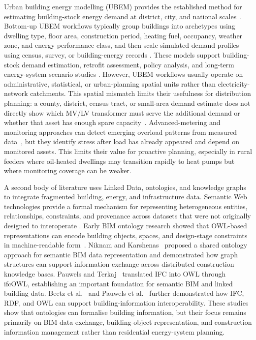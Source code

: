 \documentclass[preprint,12pt]{elsarticle}
\begin{document}
Urban building energy modelling (UBEM) provides the established method for
estimating building-stock energy demand at district, city, and national
scales~\cite{reinhart_urban_2016,cerezo_davila_comparison_2016,
hong_ten_2020,kamel_systematic_2022,oraiopoulos_accuracy_2022}.
Bottom-up UBEM workflows typically group buildings into archetypes using
dwelling type, floor area, construction period, heating fuel, occupancy,
weather zone, and energy-performance class, and then scale simulated demand
profiles using census, survey, or building-energy records
\cite{tabula_typology_2012,ali_residential_2023,sood_simulation-based_2023,
deng_archetype_2022,fonseca_city_2016}.
These models support building-stock demand estimation, retrofit assessment,
policy analysis, and long-term energy-system scenario studies
\cite{swan_modeling_2009,kavgic_review_2010,mastrucci_modelling_2014,
famuyibo_developing_2012,nouvel_citygml_2015}.
However, UBEM workflows usually operate on administrative, statistical, or
urban-planning spatial units rather than electricity-network catchments.
This spatial mismatch limits their usefulness for distribution planning:
a county, district, census tract, or small-area demand estimate does not
directly show which MV/LV transformer must serve the additional demand or
whether that asset has enough spare capacity~\cite{zaidi_impact_2020}.
Advanced-metering and monitoring approaches can detect emerging overload
patterns from measured data~\cite{wang_impact_2025,richardson_domestic_2010,
mcqueen_review_2021}, but they identify stress after load has already
appeared and depend on monitored assets.
This limits their value for proactive planning, especially in rural feeders
where oil-heated dwellings may transition rapidly to heat pumps but where
monitoring coverage can be weaker.

A second body of literature uses Linked Data, ontologies, and knowledge
graphs to integrate fragmented building, energy, and infrastructure data.
Semantic Web technologies provide a formal mechanism for representing
heterogeneous entities, relationships, constraints, and provenance across
datasets that were not originally designed to interoperate
\cite{bernerslee_semantic_2001,gruber_translation_1993,horrocks_owl_2003}.
Early BIM ontology research showed that OWL-based representations can encode
building objects, spaces, and design-stage constraints in machine-readable
form~\cite{lee_building_nodate,karshenas_ontology-based_2013}.
Niknam and Karshenas~\cite{niknam_shared_2017} proposed a shared ontology
approach for semantic BIM data representation and demonstrated how graph
structures can support information exchange across distributed construction
knowledge bases.
Pauwels and Terkaj~\cite{pauwels_express_2016} translated IFC into OWL
through ifcOWL, establishing an important foundation for semantic BIM and
linked building data.
Beetz et al.~\cite{beetz_ifcowl_2009} and Pauwels et al.~\cite{pauwels_semantic_2017}
further demonstrated how IFC, RDF, and OWL can support building-information
interoperability.
These studies show that ontologies can formalise building information, but
their focus remains primarily on BIM data exchange, building-object
representation, and construction information management rather than
residential energy-system planning.
\end{document}
